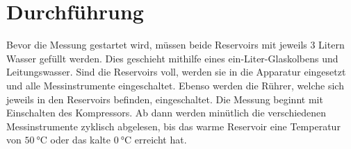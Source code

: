 \section{Durchführung}
\label{sec:Durchführung}
Bevor die Messung gestartet wird, müssen beide Reservoirs mit jeweils 3 Litern Wasser gefüllt werden.
Dies geschieht mithilfe eines ein-Liter-Glaskolbens und Leitungswasser. Sind die Reservoirs voll, werden
sie in die Apparatur eingesetzt und alle Messinstrumente eingeschaltet. Ebenso werden die Rührer, 
welche sich jeweils in den Reservoirs befinden, eingeschaltet. Die Messung beginnt mit 
Einschalten des Kompressors. Ab dann werden minütlich die verschiedenen Messinstrumente zyklisch abgelesen,
bis das warme Reservoir eine Temperatur von $\qty{50}{\celsius}$ oder das kalte 
$\qty{0}{\celsius}$ erreicht hat. 
